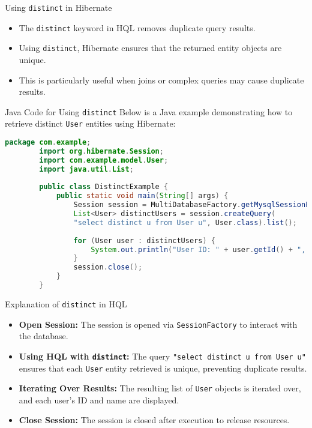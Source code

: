 \documentclass[aspectratio=169, table]{beamer}
\begin{document}
\begin{frame}{Using \texttt{distinct} in Hibernate}
	\vspace{20pt}
	\begin{itemize}
		\item The \texttt{distinct} keyword in HQL removes duplicate query results.
		\item Using \texttt{distinct}, Hibernate ensures that the returned entity objects are unique.
		\item This is particularly useful when joins or complex queries may cause duplicate results.
	\end{itemize}
\end{frame}

\begin{frame}[fragile]{Java Code for Using \texttt{distinct}}
	\vspace{20pt}
	Below is a Java example demonstrating how to retrieve distinct \texttt{User} entities using Hibernate:
	
	\begin{lstlisting}[language=Java, style=JavaStyle]
		package com.example;
		import org.hibernate.Session;
		import com.example.model.User;
		import java.util.List;
		
		public class DistinctExample {
			public static void main(String[] args) {
				Session session = MultiDatabaseFactory.getMysqlSessionFactory().openSession();
				List<User> distinctUsers = session.createQuery(
				"select distinct u from User u", User.class).list();
				
				for (User user : distinctUsers) {
					System.out.println("User ID: " + user.getId() + ", Name: " + user.getName());
				}
				session.close();
			}
		}
	\end{lstlisting}
\end{frame}

\begin{frame}{Explanation of \texttt{distinct} in HQL}
	\vspace{20pt}
	\begin{itemize}
		\item \textbf{Open Session:} The session is opened via \texttt{SessionFactory} to interact with the database.
		\item \textbf{Using HQL with \texttt{distinct}:} The query \texttt{"select distinct u from User u"} ensures that each \texttt{User} entity retrieved is unique, preventing duplicate results.
		\item \textbf{Iterating Over Results:} The resulting list of \texttt{User} objects is iterated over, and each user’s ID and name are displayed.
		\item \textbf{Close Session:} The session is closed after execution to release resources.
	\end{itemize}
\end{frame}
\end{document}
